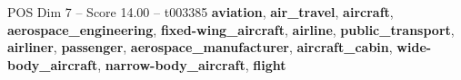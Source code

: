 \begin{textsample}{POS Dim 7 – Score 14.00 – t003385}  \label{ex:f7_pos_039}
\textbf{aviation}, \textbf{air\_travel}, \textbf{aircraft}, \textbf{aerospace\_engineering}, \textbf{fixed-wing\_aircraft}, \textbf{airline}, \textbf{public\_transport}, \textbf{airliner}, \textbf{passenger}, \textbf{aerospace\_manufacturer}, \textbf{aircraft\_cabin}, \textbf{wide-body\_aircraft}, \textbf{narrow-body\_aircraft}, \textbf{flight}

\end{textsample}
